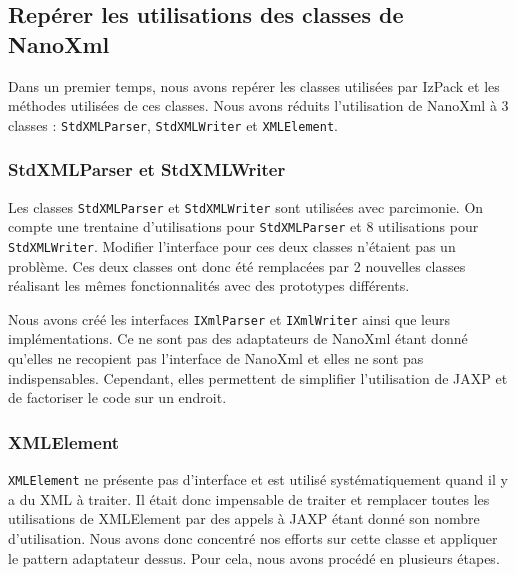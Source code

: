 \subsection{Repérer les utilisations des classes de NanoXml}
Dans un premier temps, nous avons repérer les classes utilisées par IzPack et les méthodes utilisées de ces classes.
Nous avons réduits l'utilisation de NanoXml à 3 classes : \verb|StdXMLParser|, \verb|StdXMLWriter| et \verb|XMLElement|.
\subsubsection{StdXMLParser et StdXMLWriter}
Les classes \verb|StdXMLParser| et \verb|StdXMLWriter| sont utilisées avec parcimonie.
On compte une trentaine d'utilisations pour \verb|StdXMLParser| et 8 utilisations pour \verb|StdXMLWriter|.
Modifier l'interface pour ces deux classes n'étaient pas un problème.
Ces deux classes ont donc été remplacées par 2 nouvelles classes réalisant les mêmes fonctionnalités avec des prototypes différents.

Nous avons créé les interfaces \verb|IXmlParser| et \verb|IXmlWriter| ainsi que leurs implémentations.
Ce ne sont pas des adaptateurs de NanoXml étant donné qu'elles ne recopient pas l'interface de NanoXml et elles ne sont pas indispensables.
Cependant, elles permettent de simplifier l'utilisation de JAXP et de factoriser le code sur un endroit.
\subsubsection{XMLElement}
\verb|XMLElement| ne présente pas d'interface et est utilisé systématiquement quand il y a du XML à traiter.
Il était donc impensable de traiter et remplacer toutes les utilisations de XMLElement par des appels à JAXP étant donné son nombre d'utilisation.
Nous avons donc concentré nos efforts sur cette classe et appliquer le pattern adaptateur dessus.
Pour cela, nous avons procédé en plusieurs étapes.

